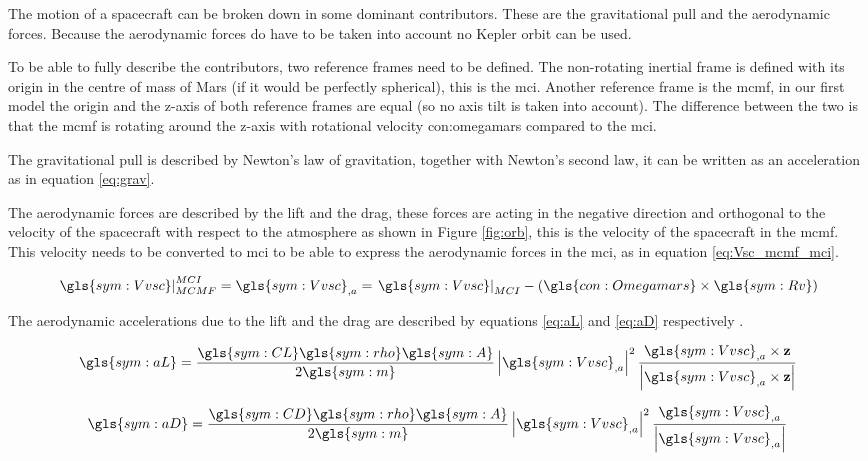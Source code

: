 The motion of a spacecraft can be broken down in some dominant contributors. These are the gravitational pull and the aerodynamic forces. Because the aerodynamic forces do have to be taken into account no Kepler orbit can be used.

To be able to fully describe the contributors, two reference frames need to be defined. The non-rotating inertial frame is defined with its origin in the centre of mass of Mars (if it would be perfectly spherical), this is the \gls{mci}. 
Another reference frame is the \gls{mcmf}, in our first model the origin and the z-axis of both reference frames are equal (so no axis tilt is taken into account). The difference between the two is that the \gls{mcmf} is rotating around the z-axis with rotational velocity \gls{con:omegamars} compared to the \gls{mci}.

The gravitational pull is described by Newton's law of gravitation, together with Newton's second law, it can be written as an acceleration as in equation \ref{eq:grav}.

The aerodynamic forces are described by the lift and the drag, these forces are acting in the negative direction and orthogonal to the velocity of the spacecraft with respect to the atmosphere as shown in Figure \ref{fig:orb}, this is the velocity of the spacecraft in the \gls{mcmf}. This velocity needs to be converted to \gls{mci} to be able to express the aerodynamic forces in the \gls{mci}, as in equation \ref{eq:Vsc_mcmf_mci}.

\begin{equation} \label{eq:Vsc_mcmf_mci}
\left.\gls{sym:Vvsc}\right|_{MCMF}^{MCI} = \gls{sym:Vvsc}_{,a} = \left.\gls{sym:Vvsc}\right|_{MCI} - \left(\gls{con:Omegamars} \times \gls{sym:Rv} \right)
\end{equation}

The aerodynamic accelerations due to the lift and the drag are described by equations \ref{eq:aL} and \ref{eq:aD} respectively \cite{AndersonJr.2007}.

\begin{equation} \label{eq:aL}
\gls{sym:aL} = \frac{\gls{sym:CL}\gls{sym:rho}\gls{sym:A}}{2 \gls{sym:m}} 
				\left|\gls{sym:Vvsc}_{,a}\right|^2
				\frac{\gls{sym:Vvsc}_{,a} \times \mathbf{z}}
				{\left| \gls{sym:Vvsc}_{,a} \times \mathbf{z}\right|}
\end{equation}

\begin{equation} \label{eq:aD}
\gls{sym:aD} = \frac{\gls{sym:CD}\gls{sym:rho}\gls{sym:A}}{2 \gls{sym:m}}
				\left|\gls{sym:Vvsc}_{,a}\right|^2 \frac{\gls{sym:Vvsc}_{,a}}{\left|\gls{sym:Vvsc}_{,a}\right|}
\end{equation}

